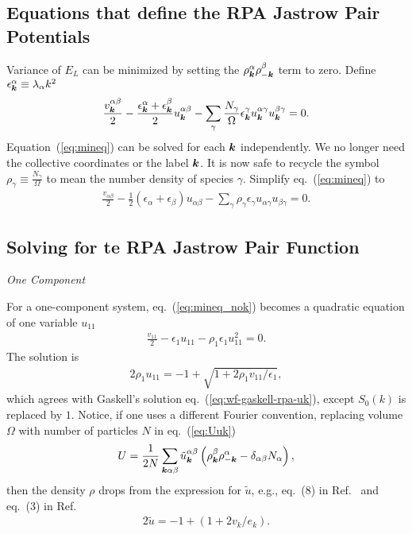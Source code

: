 \subsection{Equations that define the RPA Jastrow Pair Potentials}
Variance of $E_L$ can be minimized by setting the $\rho_{\boldsymbol{k}}^\alpha\rho_{-\boldsymbol{k}}^\beta$ term to zero. Define $\epsilon^\alpha_{\boldsymbol{k}}\equiv \lambda_\alpha k^2$
\begin{align}
\frac{v^{\alpha\beta}_{\boldsymbol{k}}}{2} - \frac{\epsilon^\alpha_{\boldsymbol{k}}+\epsilon^\beta_{\boldsymbol{k}}}{2}
u_{\boldsymbol{k}}^{\alpha\beta} -
\sum\limits_\gamma \frac{N_\gamma}{\Omega} \epsilon^\gamma_{\boldsymbol{k}} u_{\boldsymbol{k}}^{\alpha\gamma}u_{\boldsymbol{k}}^{\beta\gamma} = 0. \label{eq:mineq}
\end{align}
Equation~(\ref{eq:mineq}) can be solved for each $\boldsymbol{k}$ independently. We no longer need the collective coordinates or the label $\boldsymbol{k}$. It is now safe to recycle the symbol $\rho_\gamma\equiv\frac{N_\gamma}{\Omega}$ to mean the number density of species $\gamma$. Simplify eq.~(\ref{eq:mineq}) to
\begin{align}
\frac{v_{\alpha\beta}}{2} - \frac{1}{2}(\epsilon_\alpha+\epsilon_\beta)
u_{\alpha\beta} -
\sum\limits_\gamma \rho_\gamma \epsilon_\gamma 
u_{\alpha\gamma}u_{\beta\gamma} = 0 . \label{eq:mineq_nok}
\end{align}

\subsection{Solving for te RPA Jastrow Pair Function}

\textit{One Component}

For a one-component system, eq.~(\ref{eq:mineq_nok}) becomes a quadratic equation of one variable $u_{11}$
\begin{align}
\frac{v_{11}}{2} - \epsilon_1 u_{11} - \rho_1\epsilon_1u_{11}^2 = 0.
\end{align}
The solution is
\begin{align}
2\rho_1 u_{11} = -1 + \sqrt{1+2\rho_1v_{11}/\epsilon_1}, \label{eq:oc-rpa-uk}
\end{align}
which agrees with Gaskell's solution eq.~(\ref{eq:wf-gaskell-rpa-uk}), except $S_0(k)$ is replaced by $1$. Notice, if one uses a different Fourier convention, replacing volume $\Omega$ with number of particles $N$ in eq.~(\ref{eq:Uuk})
\begin{align}
U = \frac{1}{2N} \sum\limits_{\boldsymbol{k}\alpha\beta}
\tilde{u}^{\alpha\beta}_{\boldsymbol{k}} \left( \rho^\beta_{\boldsymbol{k}}\rho^\alpha_{-\boldsymbol{k}}-\delta_{\alpha\beta}N_\alpha
\right),
\end{align}
then the density $\rho$ drops from the expression for $\tilde{u}$, e.g., eq.~(8) in Ref.~\cite{Ceperley1978} and eq.~(3) in Ref.~\cite{Ceperley1981}
\begin{align}
2\tilde{u} = -1 + (1+2v_k/e_k).
\end{align}

